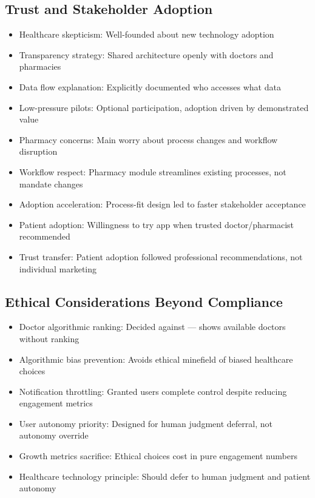 \documentclass[12pt,a4paper]{report}
\begin{document}
\subsection{Trust and Stakeholder Adoption}

\begin{itemize}
  \item Healthcare skepticism: Well-founded about new technology adoption
  \item Transparency strategy: Shared architecture openly with doctors and pharmacies
  \item Data flow explanation: Explicitly documented who accesses what data
  \item Low-pressure pilots: Optional participation, adoption driven by demonstrated value
  \item Pharmacy concerns: Main worry about process changes and workflow disruption
  \item Workflow respect: Pharmacy module streamlines existing processes, not mandate changes
  \item Adoption acceleration: Process-fit design led to faster stakeholder acceptance
  \item Patient adoption: Willingness to try app when trusted doctor/pharmacist recommended
  \item Trust transfer: Patient adoption followed professional recommendations, not individual marketing
\end{itemize}

\subsection{Ethical Considerations Beyond Compliance}

\begin{itemize}
  \item Doctor algorithmic ranking: Decided against — shows available doctors without ranking
  \item Algorithmic bias prevention: Avoids ethical minefield of biased healthcare choices
  \item Notification throttling: Granted users complete control despite reducing engagement metrics
  \item User autonomy priority: Designed for human judgment deferral, not autonomy override
  \item Growth metrics sacrifice: Ethical choices cost in pure engagement numbers
  \item Healthcare technology principle: Should defer to human judgment and patient autonomy
\end{itemize}
\end{document}

